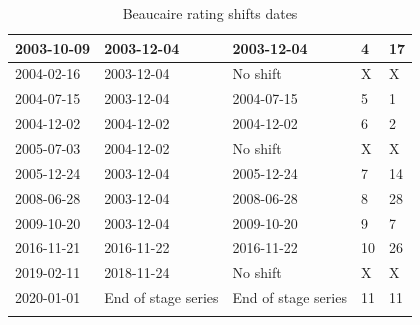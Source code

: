 \documentclass[11pt]{article}
\begin{document}
\begin{center}
\begin{table}[h!]
\begin{tabular}{|m{2.5cm}|m{3.5cm}|m{3.5cm}|m{1.5cm}|m{2.5cm}|}
                \hline
                2003-10-09     &       2003-12-04  &   2003-12-04   & 4 & 17 \\
                \hline
                2004-02-16     &       2003-12-04  &   No shift   & X & X \\
                \hline
                2004-07-15     &       2003-12-04  &   2004-07-15   & 5 & 1 \\
                \hline
                2004-12-02     &       2004-12-02  &   2004-12-02   & 6 & 2 \\
                \hline
                2005-07-03     &       2004-12-02  &   No shift  & X & X \\
                \hline
                2005-12-24     &       2003-12-04  &   2005-12-24  & 7 & 14 \\
                \hline
                2008-06-28     &       2003-12-04  &   2008-06-28    & 8 & 28 \\
                \hline
                2009-10-20     &       2003-12-04  &   2009-10-20   & 9 & 7 \\
                \hline
                2016-11-21     &       2016-11-22  &   2016-11-22  & 10 & 26 \\
                \hline
                2019-02-11     &       2018-11-24  &   No shift   & X & X \\
                \hline
                2020-01-01     &      End of stage series  &   End of stage series  & 11 & 11\\
                \lasthline
            \end{tabular}
            
            \caption{Beaucaire rating shifts dates}
            \label{tab:ShiftDates}
        \end{table}
    \end{center}
\end{document}
